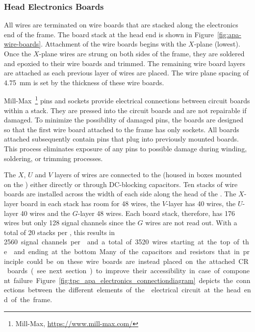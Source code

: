 \subsubsection{Head Electronics Boards}

All  wires are terminated on wire boards that are stacked along the electronics end of the  frame.  The board stack at the head end is shown in Figure~\ref{fig:apa-wire-boards}. Attachment of the wire boards begins with the $X$-plane (lowest). Once the $X$-plane wires are strung on both sides of the  frame, they are soldered and epoxied to their wire boards and trimmed. The remaining wire board layers are attached as each previous layer of wires are placed.  The wire plane spacing of \SI{4.75}{mm} is set by the thickness of these wire boards.   

Mill-Max~\footnote{Mill-Max\texttrademark{}, \url{https://www.mill-max.com/}} pins and sockets provide electrical connections between circuit boards within a stack. They are pressed into the circuit boards and are not repairable if damaged. To minimize the possibility of damaged pins, the boards are designed so that the first wire board attached to the frame has only sockets. All boards attached subsequently contain pins that plug into previously mounted boards. This process eliminates exposure of any pins to possible damage during winding, soldering, or trimming processes.

The $X$, $U$ and $V$ layers of wires are connected to the  (housed in boxes mounted on the ) either directly or through DC-blocking capacitors.  Ten stacks of wire boards are installed across the width of each side along the head of the .  The $X$-layer board in each stack has room for \num{48} wires, the $V$-layer has 40 wires, the $U$-layer \num{40} wires and the $G$-layer \num{48} wires.  Each board stack, therefore, has 176 wires but only \num{128} signal channels since the $G$ wires are not read out. With a total of \num{20} stacks per , this results in \SI{2560} signal channels per  and a total of \SI{3520} wires starting at the top of the  and ending at the bottom. Many of the capacitors and resistors that in principle could be on these wire boards are instead placed on the attached CR boards (see next section) to improve their accessibility in case of component failure. Figure~\ref{fig:tpc_apa_electronics_connectiondiagram} depicts the connections between the different elements of the  electrical circuit at the head end of the frame. 

